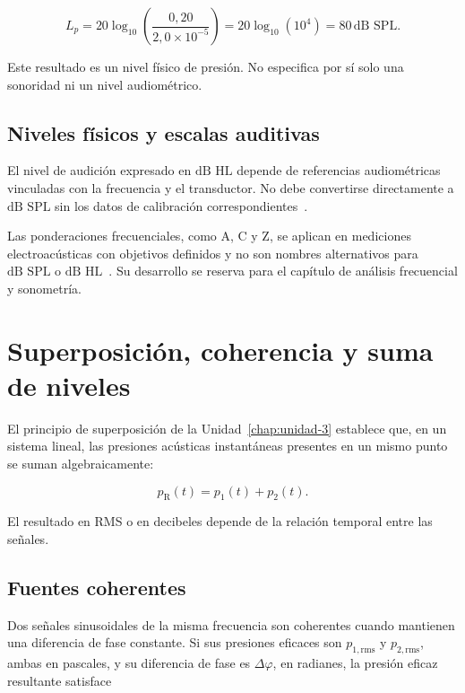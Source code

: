 \[
    L_p
      =20\log_{10}\!\left(
       \frac{0{,}20}{2{,}0\times10^{-5}}\right)
      =20\log_{10}(10^4)
      =80\,\text{dB SPL}.
\]

Este resultado es un nivel físico de presión. No especifica por sí solo una
sonoridad ni un nivel audiométrico.

\subsection{Niveles físicos y escalas auditivas}
\label{sec:u4-niveles-auditivos}

El nivel de audición expresado en \(\text{dB HL}\) depende de
referencias audiométricas vinculadas con la frecuencia y el transductor. No
debe convertirse directamente a \(\text{dB SPL}\) sin los datos de calibración
correspondientes~\cite{iso389_1_2017}.

Las ponderaciones frecuenciales, como A, C y Z, se aplican en
mediciones electroacústicas con objetivos definidos y no son nombres
alternativos para \(\text{dB SPL}\) o \(\text{dB HL}\)~\cite{iec61672_1_2013}. Su desarrollo se
reserva para el capítulo de análisis frecuencial y sonometría.

\section{Superposición, coherencia y suma de niveles}
\label{sec:u4-coherencia-suma}

El principio de superposición de la Unidad~\ref{chap:unidad-3} establece que,
en un sistema lineal, las presiones acústicas instantáneas presentes en un
mismo punto se suman algebraicamente:
\nopagebreak[4]

\begin{equation}
    p_\mathrm{R}(t)=p_1(t)+p_2(t).
    \label{eq:u4-suma-presiones}
\end{equation}

El resultado en RMS o en decibeles depende de la relación temporal entre las
señales.

\subsection{Fuentes coherentes}
\label{sec:u4-fuentes-coherentes}

Dos señales sinusoidales de la misma frecuencia son coherentes cuando mantienen
una diferencia de fase constante. Si sus presiones eficaces son
\(p_{1,\mathrm{rms}}\) y \(p_{2,\mathrm{rms}}\), ambas en pascales, y su
diferencia de fase es \(\Delta\varphi\), en radianes, la presión eficaz
resultante satisface

